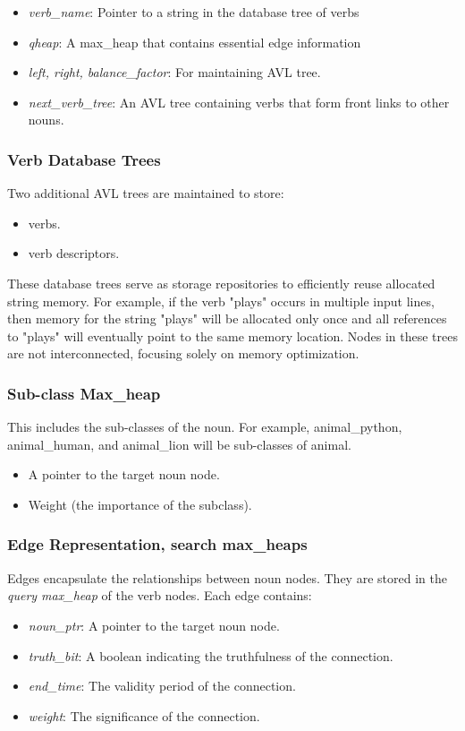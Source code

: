 \documentclass[conference]{IEEEtran}
\begin{document}
\begin{itemize}

    \item \textit{verb\_name}: Pointer to a string in the database tree of verbs
    \item \textit{qheap}: A max\_heap that contains essential edge information
    \item \textit{left, right, balance\_factor}: For maintaining AVL tree. 
    \item \textit{next\_verb\_tree}: An AVL tree containing verbs that form front links to other nouns.
    
\end{itemize}

\subsubsection{\textbf{Verb Database Trees}}
Two additional AVL trees are maintained to store:
\begin{itemize}
    \item verbs.
    \item verb descriptors.
\end{itemize}
These database trees serve as storage repositories to efficiently reuse allocated string memory. 
For example, if the verb "plays" occurs in multiple input lines, then memory for the string "plays" will be allocated only once and all references to "plays" will eventually point to the same memory location. 
Nodes in these trees are not interconnected, focusing solely on memory optimization.

\subsubsection{\textbf{Sub-class Max\_heap}}
This includes the sub-classes of the noun. For example, animal\_python, animal\_human, and animal\_lion will be sub-classes of animal. 
\begin{itemize}
    \item A pointer to the target noun node.
    \item Weight (the importance of the subclass).
\end{itemize}


\subsubsection{\textbf{Edge Representation, search max\_heaps}}
Edges encapsulate the relationships between noun nodes. They are stored in the \textit{query max\_heap} of the verb nodes. Each edge contains:
\begin{itemize}

    \item \textit{noun\_ptr}: A pointer to the target noun node.
    \item \textit{truth\_bit}: A boolean indicating the truthfulness of the connection.
    \item \textit{end\_time}: The validity period of the connection.
    \item \textit{weight}: The significance of the connection.
\end{itemize}
\end{document}
